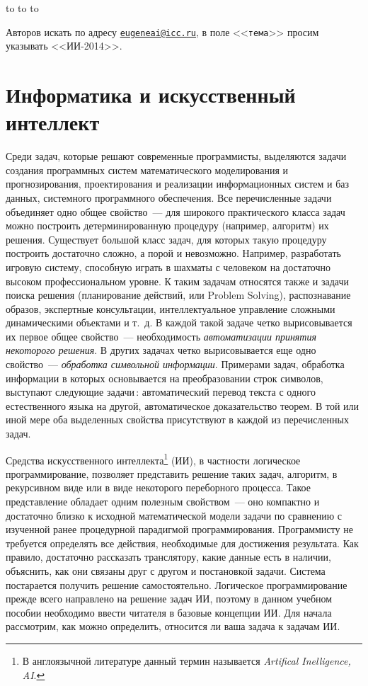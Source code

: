 \documentclass[a4paper,14pt, openany, twoside, draft]{extbook} %
\newcommand{\aaa}[2][acolor]{\noindent\textcolor{eclr}%
{+\ [}\textcolor{#1}{#2}\textcolor{eclr}{]}}
\begin{document}

\medskip

\noindent\hbox to \linewidth{\hfill\sf От имени и по поручению коллектива авторов,}
\noindent\hbox to \linewidth{\hfill\sf Доцент кафедры ИТ ИМЭИ ИГУ}
\noindent\hbox to \linewidth{\hfill\sf канд.~техн.~наук Е.~А.~Черкашин}

\vfill
\makeatletter
{} Авторов искать по адресу \href{mailto:eugeneai@icc.ru}{\tt{}eugeneai@icc.ru}, в поле <<{\tt тема}>> просим указывать <<ИИ-2014>>.
\makeatother

\chapter{Информатика и искусственный интеллект}

Среди задач, которые решают современные программисты, выделяются задачи создания программных систем математического моделирования и прогнозирования, проектирования и реализации информационных систем и баз данных, системного программного обеспечения. Все перечисленные задачи объединяет одно общее свойство~--- для широкого практического класса задач можно построить детерминированную процедуру (например, алгоритм) их решения. Существует большой класс задач, для которых такую процедуру построить достаточно сложно, а порой и невозможно. Например, разработать игровую систему, способную играть в шахматы с человеком на достаточно высоком профессиональном уровне. К таким задачам относятся также и задачи поиска решения (планирование действий, или Problem Solving), распознавание образов, экспертные консультации, интеллектуальное управление сложными динамическими объектами и т.~д. В каждой такой задаче четко вырисовывается их первое общее свойство~--- необходимость {\em автоматизации принятия некоторого решения}. В других задачах четко вырисовывается еще одно свойство~--- {\em обработка символьной информации}. Примерами задач, обработка информации в которых основывается на преобразовании строк символов, выступают следующие задачи\,: автоматический перевод текста с одного естественного языка на другой, автоматическое доказательство теорем. В той или иной мере оба выделенных свойства присутствуют в каждой из перечисленных задач.

Средства искусственного интеллекта\footnote{В англоязычной литературе данный термин называется \emph{Artifical Inelligence, AI}.} (ИИ), в частности логическое программирование, позволяет представить решение таких задач, алгоритм, в рекурсивном виде или в виде некоторого переборного процесса. Такое представление обладает одним полезным свойством~--- оно компактно и достаточно близко к исходной математической модели задачи по сравнению с изученной ранее процедурной парадигмой программирования. Программисту не требуется определять все действия, необходимые для достижения результата. Как правило, достаточно рассказать транслятору, какие данные есть в наличии, объяснить, как они связаны друг с другом и постановкой задачи. Система постарается получить решение самостоятельно. Логическое программирование прежде всего направлено на решение задач ИИ, поэтому в данном учебном пособии необходимо ввести читателя в базовые концепции ИИ. Для начала рассмотрим, как можно определить, относится ли ваша задача к задачам ИИ.
\end{document}
